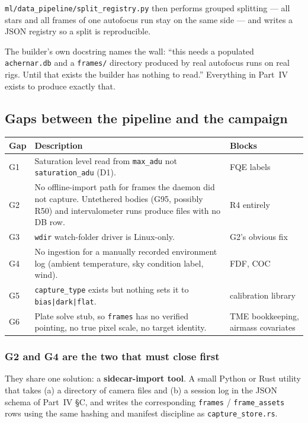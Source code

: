 \documentclass[11pt]{article}
\newcommand{\co}[1]{\texttt{\small #1}}
\begin{document}
\co{ml/data\_pipeline/split\_registry.py} then performs grouped splitting ---
all stars and all frames of one autofocus run stay on the same side --- and
writes a JSON registry so a split is reproducible.

\begin{warnbox}
The builder's own docstring names the wall: ``this needs a populated
\co{achernar.db} and a \co{frames/} directory produced by real autofocus runs on
real rigs. Until that exists the builder has nothing to read.'' Everything in
Part~IV exists to produce exactly that.
\end{warnbox}

\subsection{Gaps between the pipeline and the campaign}\label{sec:gaps}

\begin{center}
\small
\begin{tabular}{@{}lp{}l@{}}
\toprule
\textbf{Gap} & \textbf{Description} & \textbf{Blocks} \\
\midrule
G1 & Saturation level read from \co{max\_adu} not \co{saturation\_adu} (D1). & FQE labels \\
G2 & No offline-import path for frames the daemon did not capture. Untethered bodies (G95, possibly R50) and intervalometer runs produce files with no DB row. & R4 entirely \\
G3 & \co{wdir} watch-folder driver is Linux-only. & G2's obvious fix \\
G4 & No ingestion for a manually recorded environment log (ambient temperature, sky condition label, wind). & FDF, COC \\
G5 & \co{capture\_type} exists but nothing sets it to \co{bias|dark|flat}. & calibration library \\
G6 & Plate solve stub, so \co{frames} has no verified pointing, no true pixel scale, no target identity. & TME bookkeeping, airmass covariates \\
\bottomrule
\end{tabular}
\end{center}

\subsubsection*{G2 and G4 are the two that must close first}

They share one solution: a \textbf{sidecar-import tool}. A small Python or Rust
utility that takes (a) a directory of camera files and (b) a session log in the
JSON schema of Part~IV \S C, and writes the corresponding \co{frames} /
\co{frame\_assets} rows using the same hashing and manifest discipline as
\co{capture\_store.rs}.
\end{document}
